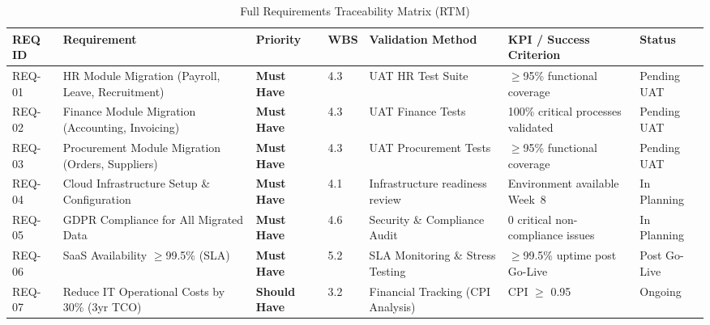 \begin{table}[H]
\centering
\caption{Full Requirements Traceability Matrix (RTM)}
\label{tab:rtm}
\renewcommand{\arraystretch}{1.65}
\scriptsize
\begin{tabular}{|p{1.1cm}|p{3.2cm}|p{1.8cm}|p{0.9cm}|p{2.8cm}|p{2.6cm}|p{1.2cm}|}
\hline

\textbf{REQ ID} &
\textbf{Requirement} &
\textbf{Priority} &
\textbf{WBS} &
\textbf{Validation Method} &
\textbf{KPI / Success Criterion} &
\textbf{Status} \\
\hline

REQ-01 & HR Module Migration (Payroll, Leave, Recruitment) &
\cellcolor{musthavebg}\textbf{\textcolor{musthave}{Must Have}} &
4.3 & UAT HR Test Suite & $\geq$95\% functional coverage & Pending UAT \\
\hline

REQ-02 & Finance Module Migration (Accounting, Invoicing) &
\cellcolor{musthavebg}\textbf{\textcolor{musthave}{Must Have}} &
4.3 & UAT Finance Tests & 100\% critical processes validated & Pending UAT \\
\hline

REQ-03 & Procurement Module Migration (Orders, Suppliers) &
\cellcolor{musthavebg}\textbf{\textcolor{musthave}{Must Have}} &
4.3 & UAT Procurement Tests & $\geq$95\% functional coverage & Pending UAT \\
\hline

REQ-04 & Cloud Infrastructure Setup \& Configuration &
\cellcolor{musthavebg}\textbf{\textcolor{musthave}{Must Have}} &
4.1 & Infrastructure readiness review & Environment available Week~8 & In Planning \\
\hline

REQ-05 & GDPR Compliance for All Migrated Data &
\cellcolor{musthavebg}\textbf{\textcolor{musthave}{Must Have}} &
4.6 & Security \& Compliance Audit & 0 critical non-compliance issues & In Planning \\
\hline

REQ-06 & SaaS Availability $\geq$99.5\% (SLA) &
\cellcolor{musthavebg}\textbf{\textcolor{musthave}{Must Have}} &
5.2 & SLA Monitoring \& Stress Testing & $\geq$99.5\% uptime post Go-Live & Post Go-Live \\
\hline

REQ-07 & Reduce IT Operational Costs by 30\% (3yr TCO) &
\cellcolor{shouldhavebg}\textbf{\textcolor{shouldhave}{Should Have}} &
3.2 & Financial Tracking (CPI Analysis) & CPI $\geq$ 0.95 & Ongoing \\
\hline


\end{tabular}
\end{table}
